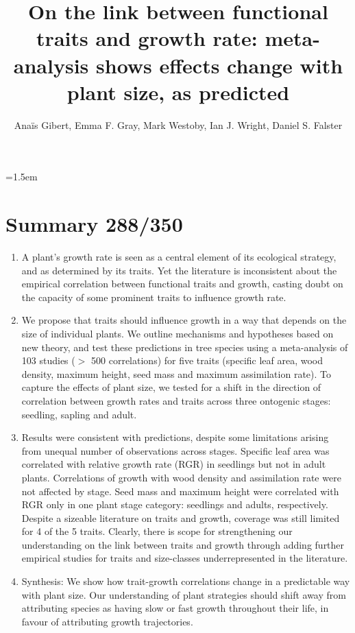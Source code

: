 \documentclass[a4paper,11pt]{article}
\title{On the link between functional traits and growth rate: meta-analysis shows effects change with plant size, as predicted}
\author{Ana{\"i}s Gibert\textasteriskcentered, Emma F. Gray, Mark Westoby, Ian J. Wright, Daniel S. Falster}
\affiliation{Biological Sciences, Macquarie University NSW 2109, Australia\\
\textasteriskcentered Email for correspondence: \texttt{anais.gibert@gmail.com}\\
Word count: ~5538 words (without supplementary material, Fig and ref)}
\date{}
\begin{document}
\mstitlepage
\noindent
\parindent=1.5em
\addtolength{\parskip}{.3em}
\doublespacing
\linenumbers
\section{Summary 288/350}\label{abstract}
\begin{enumerate}
\def\labelenumi{\arabic{enumi}.}
\itemsep1pt\parskip0pt
\item A plant's growth rate is seen as a central element of its ecological strategy, and as determined by its traits. Yet the literature is inconsistent about the empirical correlation between functional traits and growth, casting doubt on the capacity of some prominent traits to influence growth rate.

\item We propose that traits should influence growth in a way that depends on the size of individual plants. We outline mechanisms and hypotheses based on new theory, and test these predictions in tree species using a meta-analysis of 103 studies ($>$ 500 correlations) for five traits (specific leaf area, wood density, maximum height, seed mass and maximum assimilation rate). To capture the effects of plant size, we tested for a shift in the direction of correlation between growth rates and traits across three ontogenic stages: seedling, sapling and adult.

\item Results were consistent with predictions, despite some limitations arising from unequal number of observations across stages. Specific leaf area was correlated with relative growth rate (RGR) in seedlings but not in adult plants. Correlations of growth with wood density and assimilation rate were not affected by stage. Seed mass and maximum height were correlated with RGR only in one plant stage category: seedlings and adults, respectively. Despite a sizeable literature on traits and growth, coverage was still limited for 4 of the 5 traits. Clearly, there is scope for strengthening our understanding on the link between traits and growth through adding further empirical studies for traits and size-classes underrepresented in the literature.

\item Synthesis: We show how trait-growth correlations change in a predictable way with plant size. Our understanding of plant strategies should shift away from attributing species as having slow or fast growth throughout their life, in favour of attributing growth trajectories.

\end{enumerate}
\end{document}
